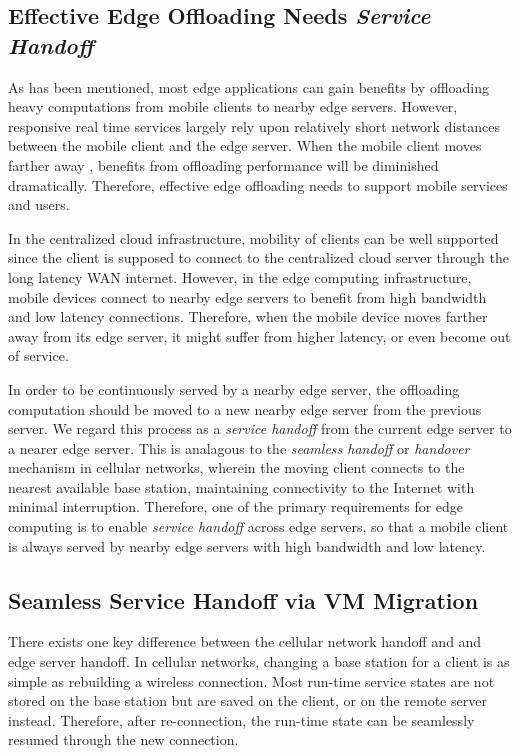 \subsection{Effective Edge Offloading Needs \textit{Service Handoff}}

As has been mentioned, most edge applications can gain benefits by offloading heavy computations from mobile clients to nearby edge servers. However, responsive real time services largely rely upon relatively short network distances between the mobile client and the edge server. When the mobile client moves farther away 
, benefits from offloading performance will be diminished dramatically.
Therefore, effective edge offloading needs to support mobile services and users.

In the centralized cloud infrastructure, mobility of clients can be well supported since the client is supposed to connect to the centralized cloud server through the long latency WAN internet. However, in the edge computing infrastructure, mobile devices connect to nearby edge servers to benefit from high bandwidth and low latency connections. Therefore, when the mobile device moves farther away from its edge server, it might suffer from higher latency, or even become out of service. 

In order to be continuously served by a nearby edge server, the offloading computation should be moved to a new nearby edge server from the previous server. We regard this process as a \textit{service  handoff} from the current edge server to a nearer edge server. 
This is analagous to the \textit{seamless handoff} or \textit{handover}  mechanism in cellular networks, wherein the moving client connects to the nearest available base station, maintaining connectivity to the Internet with minimal interruption. 
%
Therefore, one of the primary requirements for edge computing is to enable  \textit{service handoff} across edge servers, so that a mobile client is always served by nearby edge servers with high bandwidth and low latency.

\subsection{Seamless Service Handoff via VM Migration}

There exists one key difference between the cellular network handoff and and edge server handoff.
%
In cellular networks, changing a base station for a client is as simple as rebuilding a wireless connection. Most run-time service states are not stored on the base station but are saved on the client, or on the remote server instead. Therefore, after re-connection, the run-time state can be seamlessly resumed through the new connection. 

